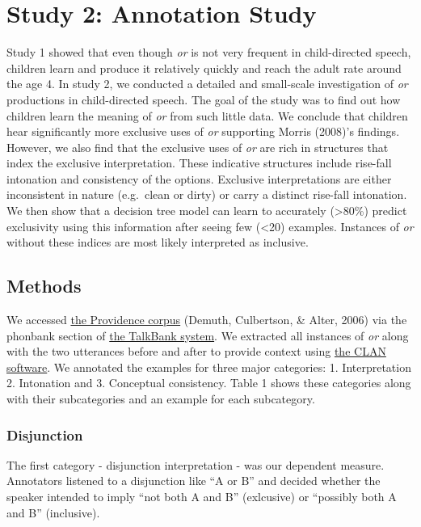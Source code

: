 \documentclass[10pt, letterpaper]{article}
\begin{document}
\section{Study 2: Annotation Study}\label{study-2-annotation-study}

Study 1 showed that even though \emph{or} is not very frequent in
child-directed speech, children learn and produce it relatively quickly
and reach the adult rate around the age 4. In study 2, we conducted a
detailed and small-scale investigation of \emph{or} productions in
child-directed speech. The goal of the study was to find out how
children learn the meaning of \emph{or} from such little data. We
conclude that children hear significantly more exclusive uses of
\emph{or} supporting Morris (2008)'s findings. However, we also find
that the exclusive uses of \emph{or} are rich in structures that index
the exclusive interpretation. These indicative structures include
rise-fall intonation and consistency of the options. Exclusive
interpretations are either inconsistent in nature (e.g.~clean or dirty)
or carry a distinct rise-fall intonation. We then show that a decision
tree model can learn to accurately (\textgreater{}80\%) predict
exclusivity using this information after seeing few (\textless{}20)
examples. Instances of \emph{or} without these indices are most likely
interpreted as inclusive.

\subsection{Methods}\label{methods-1}

We accessed
\href{https://phonbank.talkbank.org/browser/index.php?url=Eng-NA/Providence/}{the
Providence corpus} (Demuth, Culbertson, \& Alter, 2006) via the phonbank
section of \href{https://talkbank.org/}{the TalkBank system}. We
extracted all instances of \emph{or} along with the two utterances
before and after to provide context using
\href{http://alpha.talkbank.org/clan/}{the CLAN software}. We annotated
the examples for three major categories: 1. Interpretation 2. Intonation
and 3. Conceptual consistency. Table 1 shows these categories along with
their subcategories and an example for each subcategory.

\subsubsection{Disjunction}\label{disjunction}

The first category - disjunction interpretation - was our dependent
measure. Annotators listened to a disjunction like ``A or B'' and
decided whether the speaker intended to imply ``not both A and B''
(exlcusive) or ``possibly both A and B'' (inclusive).
\end{document}
